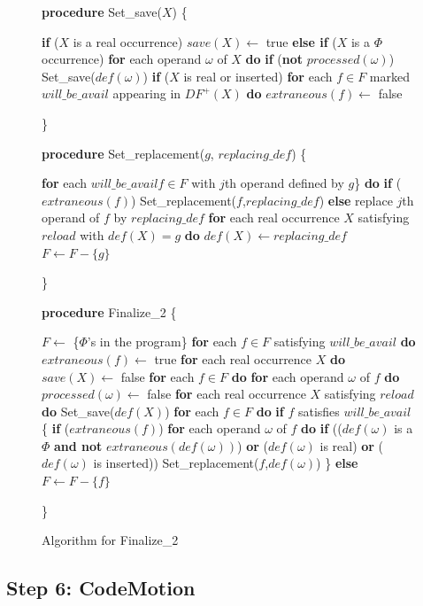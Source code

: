\begin{figure}[!ht]
{\bf procedure} Set\_save($X$) 
\{
\begin{code}
 {\bf if} ($X$ is a real occurrence)
   $save(X) \leftarrow$ true
 {\bf else if} ($X$ is a $\Phi$ occurrence)
   {\bf for} each operand $\omega$ of $X$ {\bf do}
	{\bf if} ({\bf not} $processed(\omega)$)
       Set\_save($def(\omega)$)
 {\bf if} ($X$ is real or inserted)
   {\bf for} each $f \in F$ marked $will\_be\_avail$ appearing in $DF^+(X)$ {\bf do}
       $extraneous(f) \leftarrow$ false
\end{code}
\}

{\bf procedure} Set\_replacement($g$, $replacing\_def$)
\{
\begin{code}
 {\bf for} each $will\_be\_avail f \in F$ with $j$th operand defined by $g$\} {\bf do}
   {\bf if} ($extraneous(f)$)
	Set\_replacement($f$,$replacing\_def$)
   {\bf else}
	replace $j$th operand of $f$ by $replacing\_def$
 {\bf for} each real occurrence $X$ satisfying $reload$ with $def(X) = g$ {\bf do}
   $def(X) \leftarrow replacing\_def$
 $F \leftarrow F - \{g\}$
\end{code}
\}

{\bf procedure} Finalize\_2
\{
\begin{code}
 $F \leftarrow$ \{$\Phi$'s in the program\}
 {\bf for} each $f \in F$ satisfying $will\_be\_avail$ {\bf do}
   $extraneous(f) \leftarrow$ true
 {\bf for} each real occurrence $X$ {\bf do}
   $save(X) \leftarrow$ false
 {\bf for} each $f \in F$ {\bf do}
   {\bf for} each operand $\omega$ of $f$ {\bf do} 
     $processed(\omega) \leftarrow$ false
 {\bf for} each real occurrence $X$ satisfying $reload$ {\bf do}
   Set\_save($def(X)$)
 {\bf for} each $f \in F$ {\bf do}
   {\bf if} $f$ satisfies $will\_be\_avail$ \{
	{\bf if} ($extraneous(f)$)
	  {\bf for} each operand $\omega$ of $f$ {\bf do}
	    {\bf if} (($def(\omega)$ is a $\Phi$ {\bf and not} $extraneous(def(\omega))$) {\bf or}
	      ($def(\omega)$ is real) {\bf or}
	      ($def(\omega)$ is inserted))
		Set\_replacement($f$,$def(\omega)$)
   \}
   {\bf else}
	$F \leftarrow F - \{f\}$
\end{code}
\}
\caption{Algorithm for Finalize\_2}
\label{fig: finalize2}
\end{figure}

\subsection{Step 6: CodeMotion}

